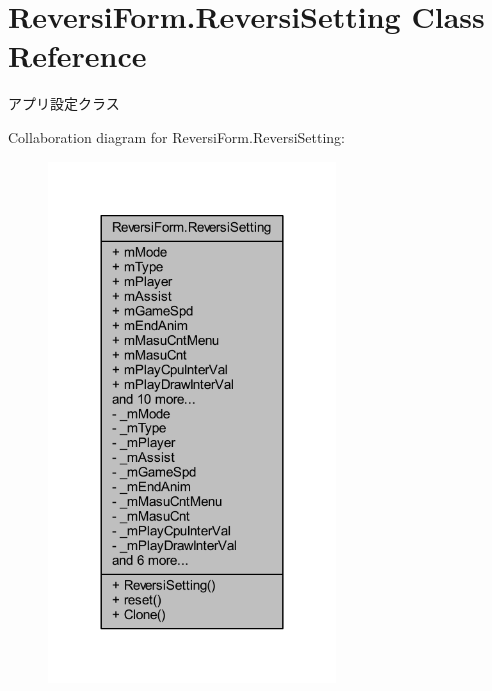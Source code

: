 \hypertarget{class_reversi_form_1_1_reversi_setting}{}\section{Reversi\+Form.\+Reversi\+Setting Class Reference}
\label{class_reversi_form_1_1_reversi_setting}


アプリ設定クラス  




Collaboration diagram for Reversi\+Form.\+Reversi\+Setting\+:\nopagebreak
\begin{figure}[H]
\begin{center}
\leavevmode
\includegraphics[width=216pt]{class_reversi_form_1_1_reversi_setting__coll__graph}
\end{center}
\end{figure}
